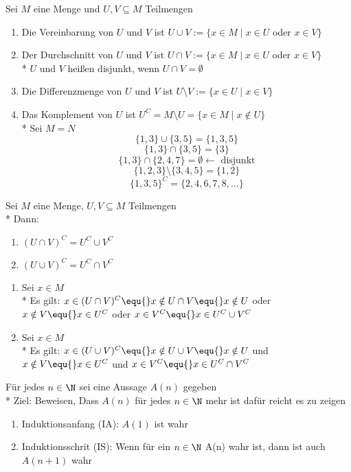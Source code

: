 Sei $M$ eine Menge und $U,V \subseteq M$ Teilmengen
\begin{enumerate}
\item Die Vereinbarung von $U$ und $V$ ist $U \cup V := \{x \in M \mid x \in U$ oder $x \in V\}$
\item Der Durchschnitt von $U$ und $V$ ist $U \cap V := \{x \in M \mid x \in U$ oder $x \in V\}$\\*
$U$ und $V$ heißen disjunkt, wenn $U \cap V = \emptyset$
\item Die Differenzmenge von $U$ und $V$ ist $U \setminus V := \{x \in U \mid x \in V\}$
\item Das Komplement von $U$ ist $U^C = M \setminus U = \{x \in M \mid x \notin U\}$\\*
%
\bsp
Sei $M = N$
$$\{1,3\} \cup \{3,5\} = \{1,3,5\}$$
$$\{1,3\} \cap \{3,5\} = \{3\}$$
$$\{1,3\} \cap \{2,4,7\} = \emptyset \leftarrow\text{ disjunkt}$$
$$\{1,2,3\} \setminus \{3,4,5\} = \{1,2\}$$
$$\{1,3,5\}^C = \{2,4,6,7,8,…\}$$
\end{enumerate}

Sei $M$ eine Menge, $U,V \subseteq M$ Teilmengen\\*
Dann:
\begin{enumerate}
\item $(U \cap V)^C = U^C \cup V^C$
\item $(U \cup V)^C = U^C \cap V^C$
\end{enumerate}
%
\bew
\begin{enumerate}
\item{Sei $x \in M$\\*
Es gilt: $x \in (U \cap V)^C \equ{} x \notin U \cap V \equ{} x \notin U$ oder $x \notin V\equ{} x \in U^C$ oder $x \in V^C \equ{} x\in U^C \cup V^C$}
\item{ Sei $x \in M$\\* Es gilt: $x \in (U \cup V)^C \equ{} x \notin U \cup V \equ{} x \notin U$ und $x \notin V\equ{} x \in U^C$ und $x \in V^C \equ{} x\in U^C \cap V^C$}
\end{enumerate}

Für jedes $n \in \N$ sei eine Aussage $A(n)$ gegeben\\*
Ziel: Beweisen, Dass $A(n)$ für jedes $n \in \N$ mehr ist dafür reicht es zu zeigen
\begin{enumerate}
\item{Induktionsanfang (IA): $A(1)$ ist wahr}
\item{Induktionsschrit (IS): Wenn für ein $n \in \N$ A(n) wahr ist, dann ist auch $A(n+1)$ wahr}
\end{enumerate}

